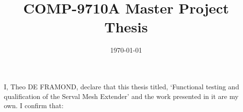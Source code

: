 \documentclass[a4paper, 11pt, oneside]{Thesis}  %
\begin{document}
\frontmatter      %

\title  {COMP-9710A Master Project Thesis}
\addresses  {\groupname\\\deptname\\\univname}  %
\date       {\today}
\maketitle


\fancyhead{}  %
\rhead{\thepage}  %
\lhead{}  %

\pagestyle{fancy}  %

\Declaration{}


I, Theo DE FRAMOND, declare that this thesis titled, `Functional testing and qualification of the Serval Mesh Extender' and the work presented in it are my own. I confirm that:
\end{document}
